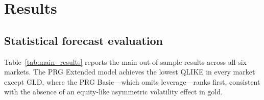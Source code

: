 \documentclass[11pt,a4paper]{article}
\begin{document}
\section{Results}

\subsection{Statistical forecast evaluation}

Table~\ref{tab:main_results} reports the main out-of-sample results across all six markets. The PRG Extended model achieves the lowest QLIKE in every market except GLD, where the PRG Basic---which omits leverage---ranks first, consistent with the absence of an equity-like asymmetric volatility effect in gold.
\end{document}
